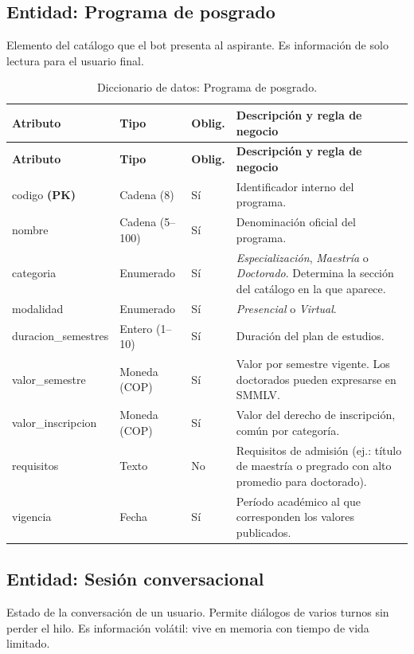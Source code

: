 \documentclass[12pt,a4paper]{report}
\newcommand{\tablacompacta}{\setstretch{1.1}\small}
\newcommand{\cabecera}[1]{\rowcolor{filacabecera}#1}
\begin{document}
\subsection{Entidad: Programa de posgrado}

Elemento del catálogo que el bot presenta al aspirante. Es información de solo lectura para el
usuario final.

{\tablacompacta
\begin{longtable}{p{3.1cm}p{2.2cm}p{1.3cm}p{6.0cm}}
\caption{Diccionario de datos: Programa de posgrado.}\label{tab:dd-programa}\\
\toprule
\cabecera{\textbf{Atributo}} & \textbf{Tipo} & \textbf{Oblig.} & \textbf{Descripción y regla de negocio} \\
\midrule
\endfirsthead
\toprule
\textbf{Atributo} & \textbf{Tipo} & \textbf{Oblig.} & \textbf{Descripción y regla de negocio} \\
\midrule
\endhead
\bottomrule
\endfoot
codigo \textbf{(PK)} & Cadena (8) & Sí & Identificador interno del programa. \\
nombre & Cadena (5--100) & Sí & Denominación oficial del programa. \\
categoria & Enumerado & Sí & \textit{Especialización}, \textit{Maestría} o \textit{Doctorado}. Determina la sección del catálogo en la que aparece. \\
modalidad & Enumerado & Sí & \textit{Presencial} o \textit{Virtual}. \\
duracion\_semestres & Entero (1--10) & Sí & Duración del plan de estudios. \\
valor\_semestre & Moneda (COP) & Sí & Valor por semestre vigente. Los doctorados pueden expresarse en SMMLV. \\
valor\_inscripcion & Moneda (COP) & Sí & Valor del derecho de inscripción, común por categoría. \\
requisitos & Texto & No & Requisitos de admisión (ej.: título de maestría o pregrado con alto promedio para doctorado). \\
vigencia & Fecha & Sí & Período académico al que corresponden los valores publicados. \\
\end{longtable}}

\subsection{Entidad: Sesión conversacional}

Estado de la conversación de un usuario. Permite diálogos de varios turnos sin perder el hilo. Es
información volátil: vive en memoria con tiempo de vida limitado.
\end{document}
